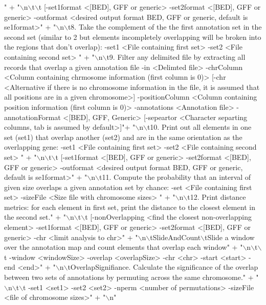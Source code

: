 \begin{DoxyCode}
{      "} +
    \textcolor{stringliteral}{"\(\backslash\)n\(\backslash\)t\(\backslash\)t [-set1format <[BED], GFF or generic> -set2format <[BED], GFF or generic> -outformat <desired
       output format BED, GFF or generic, default is se1format>"} +
    \textcolor{stringliteral}{"\(\backslash\)n\(\backslash\)t8. Take the complement of the the first annotation set in the second set (similar to 2 but
       elements incompletely overlapping will be broken into the regions that don't overlap): -set1 <File containing first
       set>  -set2 <File containing second set> "} +
    \textcolor{stringliteral}{"\(\backslash\)n\(\backslash\)t9. Filter any delimited file by extracting all records that overlap a given annotation file -in
       <Delimted file> -chrColumn <Column containing chrmosome information (first column is 0)> [-chr <Alternative if
       there is no chromosome information in the file, it is assumed that all positions are in a given
       chromosome>] -positionColumn <Column containing position information  (first column is 0)> -annotations <Annotation
       file> -annotationFormat <[BED], GFF, Generic> [-sepeartor <Character separting columns, tab is assumed by
       default>]"}+
    \textcolor{stringliteral}{"\(\backslash\)n\(\backslash\)t10. Print out all elements in one set (set1) that overlap another (set2) and are in the same
       orientation as the overlapping gene: -set1 <File containing first set>  -set2 <File containing second set> "} +
    \textcolor{stringliteral}{"\(\backslash\)n\(\backslash\)t\(\backslash\)t [-set1format <[BED], GFF or generic> -set2format <[BED], GFF or generic> -outformat <desired
       output format BED, GFF or generic, default is se1format>"} +
    \textcolor{stringliteral}{"\(\backslash\)n\(\backslash\)t11. Compute the probability that an interval of given size overlaps a given annotation set by
       chance: -set <File containing first set>  -sizeFile <Size file with chromosome sizes> "} +
    \textcolor{stringliteral}{"\(\backslash\)n\(\backslash\)t12. Print distance metrics: for each element in first set, print the distance to the closest
       element in the second set."} +
    \textcolor{stringliteral}{"\(\backslash\)n\(\backslash\)t\(\backslash\)t [-nonOverlapping <find the closest non-overlapping element> -set1format <[BED], GFF or generic>
       -set2format <[BED], GFF or generic> -chr <limit analysis to chr>"} +
    \textcolor{stringliteral}{"\(\backslash\)n\(\backslash\)tSlideAndCount\(\backslash\)tSlide a window over the annotation map and count elements that overlap each window"}
       +
    \textcolor{stringliteral}{"\(\backslash\)n\(\backslash\)t\(\backslash\)t -window <windowSize> -overlap <overlapSize> -chr <chr> -start <start> -end <end>"} +
    \textcolor{stringliteral}{"\(\backslash\)n\(\backslash\)tOverlapSignifiance. Calculate the significance of the overlap between two sets of annotations by
       permuting across the same chromosome."} +
    \textcolor{stringliteral}{"\(\backslash\)n\(\backslash\)t\(\backslash\)t -set1 <set1> -set2 <set2> -nperm <number of permutations> -sizeFile <file of chromosome sizes>"}
       +
    \textcolor{stringliteral}{"\(\backslash\)n"}
\end{DoxyCode}


